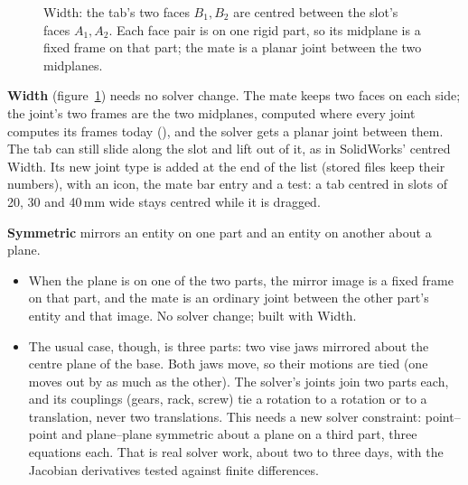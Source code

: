 \begin{figure}[!htbp]
\centering
{}
\caption{Width: the tab's two faces $B_1,B_2$ are centred between the slot's faces $A_1,A_2$. Each face pair is on
one rigid part, so its midplane is a fixed frame on that part; the mate is a planar joint between the two midplanes.}
\label{fig:width-mate}
\end{figure}

\textbf{Width} (figure~\ref{fig:width-mate}) needs no solver change. The mate keeps two faces on each side; the
joint's two frames are the two midplanes, computed where every joint computes its frames today
(), and the solver gets a planar joint between them. The tab can still slide along the slot
and lift out of it, as in SolidWorks' centred Width. Its new joint type is added at the end of the list (stored
files keep their numbers), with an icon, the mate bar entry and a test: a tab centred in slots of 20, 30 and 40\,mm
wide stays centred while it is dragged.

\textbf{Symmetric} mirrors an entity on one part and an entity on another about a plane.
\begin{itemize}
  \item When the plane is on one of the two parts, the mirror image is a fixed frame on that part, and the mate is
        an ordinary joint between the other part's entity and that image. No solver change; built with Width.
  \item The usual case, though, is three parts: two vise jaws mirrored about the centre plane of the base. Both
        jaws move, so their motions are tied (one moves out by as much as the other). The solver's joints join
        two parts each, and its couplings (gears, rack, screw) tie a rotation to a rotation or to a translation,
        never two translations. This needs a new solver constraint: point--point and plane--plane symmetric about
        a plane on a third part, three equations each. That is real solver work, about two to three days, with the
        Jacobian derivatives tested against finite differences.
\end{itemize}

